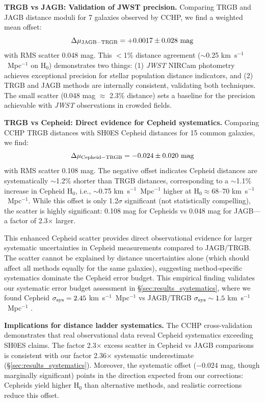 \documentclass[twocolumn, linenumbers]{aastex701}
\begin{document}
\textbf{TRGB vs JAGB: Validation of JWST precision.} Comparing TRGB and JAGB distance moduli for 7 galaxies observed by CCHP, we find a weighted mean offset:
\begin{equation}
\Delta\mu_{\rm JAGB-TRGB} = +0.0017 \pm 0.028~{\rm mag}
\end{equation}
with RMS scatter 0.048 mag. This $<$1\% distance agreement ($\sim$0.25 km~s$^{-1}$~Mpc$^{-1}$ on H$_0$) demonstrates two things: (1) \textit{JWST} NIRCam photometry achieves exceptional precision for stellar population distance indicators, and (2) TRGB and JAGB methods are internally consistent, validating both techniques. The small scatter (0.048 mag $\approx$ 2.3\% distance) sets a baseline for the precision achievable with \textit{JWST} observations in crowded fields.

\textbf{TRGB vs Cepheid: Direct evidence for Cepheid systematics.} Comparing CCHP TRGB distances with SH0ES Cepheid distances for 15 common galaxies, we find:
\begin{equation}
\Delta\mu_{\rm Cepheid-TRGB} = -0.024 \pm 0.020~{\rm mag}
\end{equation}
with RMS scatter 0.108 mag. The negative offset indicates Cepheid distances are systematically $\sim$1.2\% shorter than TRGB distances, corresponding to a $\sim$1.1\% increase in Cepheid H$_0$, i.e., $\sim$0.75 km~s$^{-1}$~Mpc$^{-1}$ higher at H$_0 \approx 68$--70 km~s$^{-1}$~Mpc$^{-1}$. While this offset is only 1.2$\sigma$ significant (not statistically compelling), the scatter is highly significant: 0.108 mag for Cepheids vs 0.048 mag for JAGB---a factor of 2.3$\times$ larger.

This enhanced Cepheid scatter provides direct observational evidence for larger systematic uncertainties in Cepheid measurements compared to JAGB/TRGB. The scatter cannot be explained by distance uncertainties alone (which should affect all methods equally for the same galaxies), suggesting method-specific systematics dominate the Cepheid error budget. This empirical finding validates our systematic error budget assessment in \S\ref{sec:results_systematics}, where we found Cepheid $\sigma_{\rm sys} = 2.45$ km~s$^{-1}$~Mpc$^{-1}$ vs JAGB/TRGB $\sigma_{\rm sys} \sim 1.5$ km~s$^{-1}$~Mpc$^{-1}$ \citep{Freedman2024}.

\textbf{Implications for distance ladder systematics.} The CCHP cross-validation demonstrates that real observational data reveal Cepheid systematics exceeding SH0ES claims. The factor 2.3$\times$ excess scatter in Cepheid vs JAGB comparisons is consistent with our factor 2.36$\times$ systematic underestimate (\S\ref{sec:results_systematics}). Moreover, the systematic offset ($-0.024$ mag, though marginally significant) points in the direction expected from our corrections: Cepheids yield higher H$_0$ than alternative methods, and realistic corrections reduce this offset.
\end{document}
